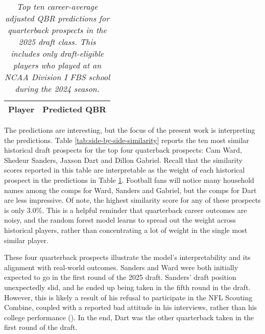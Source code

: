 \documentclass[Review, sageh, times]{sagej}
\begin{document}
\begin{table}[H]
  \centering
  \begin{tabular}{l|r}
    Player & Predicted QBR\\
    \hline
    
  \end{tabular}
  \caption{\textit{Top ten career-average adjusted QBR predictions for quarterback prospects in the 2025 draft class. This includes only draft-eligible players who played at an NCAA Division I FBS school during the 2024 season.}}
  \label{tab:top-ten}
\end{table}

The predictions are interesting, but the focus of the present work is interpreting the predictions. Table \ref{tab:side-by-side-similarity} reports the ten most similar historical draft prospects for the top four quaterback prospects: Cam Ward, Shedeur Sanders, Jaxson Dart and Dillon Gabriel. Recall that the similarity scores reported in this table are interpretable as the weight of each historical prospect in the predictions in Table \ref{tab:top-ten}. Football fans will notice many household names among the comps for Ward, Sanders and Gabriel, but the comps for Dart are less impressive. Of note, the highest similarity score for any of these prospects is only 3.0\%. This is a helpful reminder that quarterback career outcomes are noisy, and the random forest model learns to spread out the weight across historical players, rather than concentrating a lot of weight in the single most similar player.

These four quarterback prospects illustrate the model's interpretability and its alignment with real-world outcomes. Sanders and Ward were both initially expected to go in the first round of the 2025 draft. Sanders' draft position unexpectedly slid, and he ended up being taken in the fifth round in the draft. However, this is likely a result of his refusal to participate in the NFL Scouting Combine, coupled with a reported bad attitude in his interviews, rather than his college performance (\cite{mckenna_what_nodate}). In the end, Dart was the other quarterback taken in the first round of the draft.

\begin{table}[H]
  \caption{\textit{Top ten similarity scores for each of the top four quarterback prospects in the 2025 NFL draft. The similarity score is the contribution made by each historical prospect to the weighted average which constitutes the reference prospect's prediction in the random forest model.}}
  \label{tab:side-by-side-similarity}
\end{table}
\end{document}
